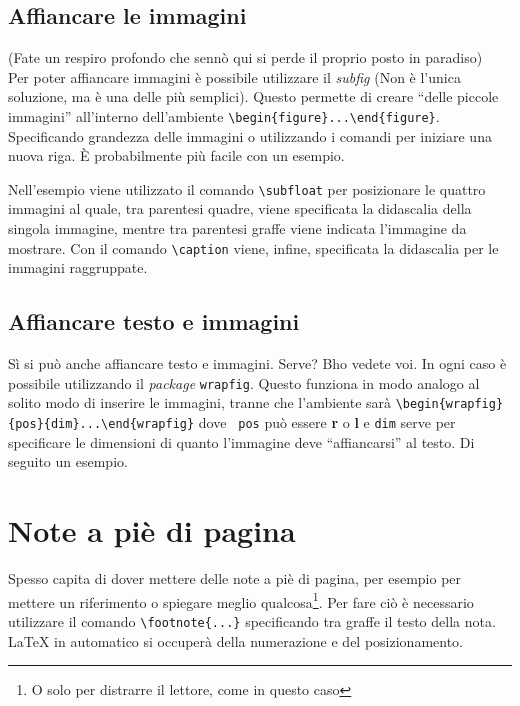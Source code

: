 \subsection{Affiancare le immagini}
(Fate un respiro profondo che sennò qui si perde il proprio posto in paradiso) 
\\
Per poter affiancare immagini è possibile utilizzare il \textit{subfig} (Non è 
l'unica soluzione, ma è una delle più semplici). Questo permette di creare 
``delle piccole immagini'' all'interno dell'ambiente 
\verb!\begin{figure}...\end{figure}!. Specificando grandezza delle immagini o 
utilizzando i comandi per iniziare una nuova riga. È probabilmente più facile 
con un esempio.

Nell'esempio viene utilizzato il comando \verb!\subfloat! per posizionare le 
quattro immagini al quale, tra parentesi quadre, viene specificata la 
didascalia della singola immagine, mentre tra parentesi graffe viene indicata 
l'immagine da mostrare. Con il comando \verb!\caption! viene, infine, 
specificata la didascalia per le immagini raggruppate.

\subsection{Affiancare testo e immagini}
Sì si può anche affiancare testo e immagini. Serve? Bho vedete voi. In ogni 
caso è possibile utilizzando il \textit{package} \verb!wrapfig!. Questo 
funziona in modo analogo al solito modo di inserire le immagini, tranne che 
l'ambiente sarà \verb!\begin{wrapfig}{pos}{dim}...\end{wrapfig}! dove \texttt{
pos} può essere \textbf{r} o \textbf{l} e \texttt{dim} serve per specificare 
le dimensioni di quanto l'immagine deve ``affiancarsi'' al testo. Di seguito un 
esempio. 



\section{Note a piè di pagina}
Spesso capita di dover mettere delle note a piè di pagina, per esempio per mettere un riferimento o spiegare meglio qualcosa\footnote{O solo per distrarre il lettore, come in questo caso}. Per fare ciò è necessario utilizzare il comando \verb!\footnote{...}! specificando tra graffe il testo della nota. \LaTeX{} in automatico si occuperà della numerazione e del posizionamento.


